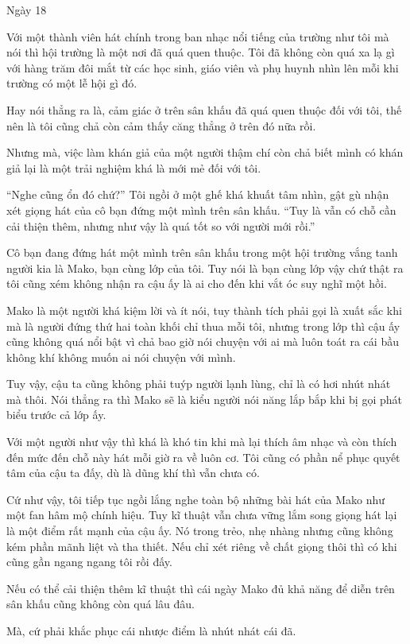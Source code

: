 {Ngày 18}
{
Với một thành viên hát chính trong ban nhạc nổi tiếng của trường như tôi
mà nói thì hội trường là một nơi đã quá quen thuộc. Tôi đã không còn quá
xa lạ gì với hàng trăm đôi mắt từ các học sinh, giáo viên và phụ huynh
nhìn lên mỗi khi trường có một lễ hội gì đó.

Hay nói thẳng ra là, cảm giác ở trên sân khấu đã quá quen thuộc đối với
tôi, thế nên là tôi cũng chả còn cảm thấy căng thẳng ở trên đó nữa rồi.

Nhưng mà, việc làm khán giả của một người thậm chí còn chả biết mình có
khán giả lại là một trải nghiệm khá là mới mẻ đối với tôi.

``Nghe cũng ổn đó chứ?'' Tôi ngồi ở một ghế khá khuất tâm nhìn, gật gù
nhận xét giọng hát của cô bạn đứng một mình trên sân khấu. ``Tuy là vẫn
có chỗ cần cải thiện thêm, nhưng như vậy là quá tốt so với người mới
rồi.''

Cô bạn đang đứng hát một mình trên sân khấu trong một hội trường vắng
tanh người kia là Mako, bạn cùng lớp của tôi. Tuy nói là bạn cùng lớp
vậy chứ thật ra tôi cũng xém không nhận ra cậu ấy là ai cho đến khi vắt
óc suy nghĩ một hồi.

Mako là một người khá kiệm lời và ít nói, tuy thành tích phải gọi là
xuất sắc khi mà là người đứng thứ hai toàn khối chỉ thua mỗi tôi, nhưng
trong lớp thì cậu ấy cũng không quá nổi bật vì chả bao giờ nói chuyện
với ai mà luôn toát ra cái bầu không khí không muốn ai nói chuyện với
mình.

Tuy vậy, cậu ta cũng không phải tuýp người lạnh lùng, chỉ là có hơi nhút
nhát mà thôi. Nói thẳng ra thì Mako sẽ là kiểu người nói năng lắp bắp
khi bị gọi phát biểu trước cả lớp ấy.

Với một người như vậy thì khá là khó tin khi mà lại thích âm nhạc và còn
thích đến mức đến chỗ này hát mỗi giờ ra về luôn cơ. Tôi cũng có phần nể
phục quyết tâm của cậu ta đấy, dù là dũng khí thì vẫn chưa có.

Cứ như vậy, tôi tiếp tục ngồi lắng nghe toàn bộ những bài hát của Mako
như một fan hâm mộ chính hiệu. Tuy kĩ thuật vẫn chưa vững lắm song giọng
hát lại là một điểm rất mạnh của cậu ấy. Nó trong trẻo, nhẹ nhàng nhưng
cũng không kém phần mãnh liệt và tha thiết. Nếu chỉ xét riêng về chất
giọng thôi thì có khi cũng gần ngang ngang tôi rồi đấy.

Nếu có thể cải thiện thêm kĩ thuật thì cái ngày Mako đủ khả năng để diễn
trên sân khấu cũng không còn quá lâu đâu.

Mà, cứ phải khắc phục cái nhược điểm là nhút nhát cái đã.

}
